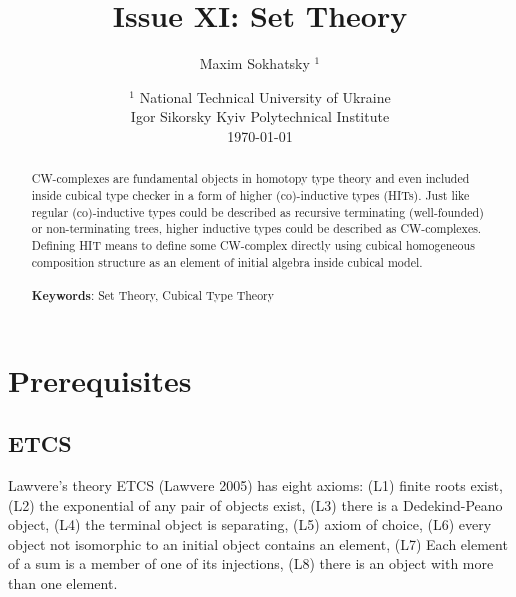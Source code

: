 \documentclass{article}
\theoremstyle{definition}
\begin{document}
\title{Issue XI: Set Theory}
\author{Maxim Sokhatsky $^1$}
\date{ $^1$ National Technical University of Ukraine \\
       \small Igor Sikorsky Kyiv Polytechnical Institute \\
       \today }

\maketitle

\begin{abstract}
CW-complexes are fundamental objects in homotopy type theory
and even included inside cubical type checker in a form of
higher (co)-inductive types (HITs).
Just like regular (co)-inductive types could be described as recursive
terminating (well-founded) or non-terminating trees,
higher inductive types could be described as CW-complexes.
Defining HIT means to define some CW-complex
directly using cubical homogeneous composition structure as an
element of initial algebra inside cubical model.
\\
\\
{\bf Keywords}: Set Theory, Cubical Type Theory
\end{abstract}
\tableofcontents

\newpage
\section{Prerequisites}

\subsection{ETCS}
Lawvere’s theory ETCS (Lawvere 2005) has eight axioms:
(L1) finite roots exist,
(L2) the exponential of any pair of objects exist,
(L3) there is a Dedekind-Peano object,
(L4) the terminal object is separating,
(L5) axiom of choice,
(L6) every object not isomorphic to an initial object contains an element,
(L7) Each element of a sum is a member of one of its injections,
(L8) there is an object with more than one element.




\end{document}
